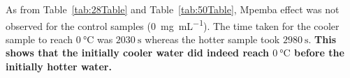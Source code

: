 \documentclass[../main.tex]{subfiles}
\begin{document}
\doublespacing


As from Table~\ref{tab:28Table} and Table~\ref{tab:50Table}, Mpemba effect was not observed for the control samples (\SI{0}{\milli\gram\per\milli\liter}). The time taken for the cooler sample to reach $\SI{0}{\celsius}$ was $\SI{2030}{\second}$ whereas the hotter sample took $\SI{2980}{\second}$. \textbf{This shows that the initially cooler water did indeed reach $\SI{0}{\celsius}$ before the initially hotter water.}   \par 
\end{document}

